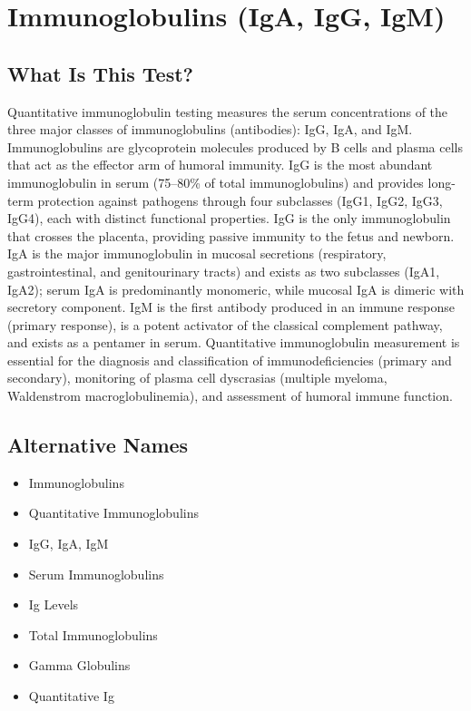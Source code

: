 \chapter{Immunoglobulins (IgA, IgG, IgM)}

\section*{What Is This Test?}
Quantitative immunoglobulin testing measures the serum concentrations of the three major classes of immunoglobulins (antibodies): IgG, IgA, and IgM. Immunoglobulins are glycoprotein molecules produced by B cells and plasma cells that act as the effector arm of humoral immunity. IgG is the most abundant immunoglobulin in serum (75--80\% of total immunoglobulins) and provides long-term protection against pathogens through four subclasses (IgG1, IgG2, IgG3, IgG4), each with distinct functional properties. IgG is the only immunoglobulin that crosses the placenta, providing passive immunity to the fetus and newborn. IgA is the major immunoglobulin in mucosal secretions (respiratory, gastrointestinal, and genitourinary tracts) and exists as two subclasses (IgA1, IgA2); serum IgA is predominantly monomeric, while mucosal IgA is dimeric with secretory component. IgM is the first antibody produced in an immune response (primary response), is a potent activator of the classical complement pathway, and exists as a pentamer in serum. Quantitative immunoglobulin measurement is essential for the diagnosis and classification of immunodeficiencies (primary and secondary), monitoring of plasma cell dyscrasias (multiple myeloma, Waldenstrom macroglobulinemia), and assessment of humoral immune function.

\section*{Alternative Names}
\begin{itemize}
  \item Immunoglobulins
  \item Quantitative Immunoglobulins
  \item IgG, IgA, IgM
  \item Serum Immunoglobulins
  \item Ig Levels
  \item Total Immunoglobulins
  \item Gamma Globulins
  \item Quantitative Ig
\end{itemize}

